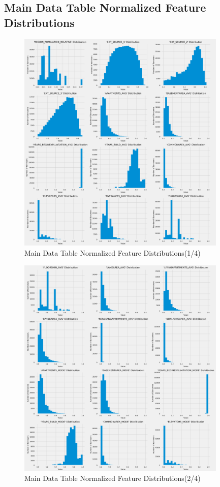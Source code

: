 \documentclass[12pt, letterpaper]{article}
\begin{document}
\begin{appendices}
\subsection{Main Data Table Normalized Feature Distributions}
\label{normalfeaturedistibs}

\begin{figure}[ht]
\includegraphics[width=0.89\textwidth]{main-data-table-normal-feature-distribs-p1}
\centering
\caption{Main Data Table Normalized Feature Distributions(1/4)}
\end{figure}

\pagebreak

\begin{figure}[ht]
\includegraphics[width=0.89\textwidth]{main-data-table-normal-feature-distribs-p2}
\centering
\caption{Main Data Table Normalized Feature Distributions(2/4)}
\end{figure}


\end{appendices}
\end{document}
